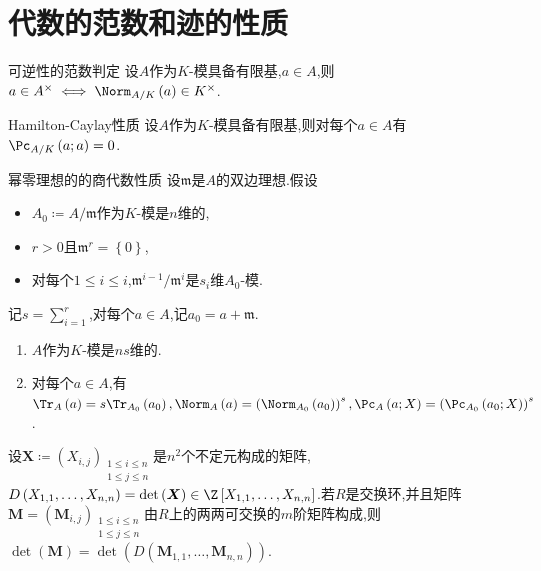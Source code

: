 \section{代数的范数和迹的性质}

\begin{proposition}{可逆性的范数判定}{}
	设$A$作为$K$-模具备有限基,$a\in A$,则$a\in A^{\times}\iff\Norm_{A/K}\left(a\right)\in K^{\times}$.
\end{proposition}

\begin{proposition}{Hamilton-Caylay性质}{}
	设$A$作为$K$-模具备有限基,则对每个$a\in A$有$\Pc_{A/K}\left(a;a\right)=0$.
\end{proposition}

\begin{proposition}{幂零理想的的商代数性质}{}
	设$\mathfrak{m}$是$A$的双边理想.假设
	\begin{itemize}
		\item $A_{0}\coloneq A/\mathfrak{m}$作为$K$-模是$n$维的,
		\item $r>0$且$\mathfrak{m}^{r}=\left\{0\right\}$,
		\item 对每个$1\leq i\leq i$,$\mathfrak{m}^{i-1}/\mathfrak{m}^{i}$是$s_{i}$维$A_{0}$-模.
	\end{itemize}
	记$s=\sum\limits_{i=1}^{r}$,对每个$a\in A$,记$a_{0}=a+\mathfrak{m}$.
	\begin{enumerate}
		\item $A$作为$K$-模是$ns$维的.
		\item 对每个$a\in A$,有$\Tr_{A}\left(a\right)=s\Tr_{A_{0}}\left(a_{0}\right),\Norm_{A}\left(a\right)=\left(\Norm_{A_{0}}\left(a_{0}\right)\right)^{s},\Pc_{A}\left(a;X\right)=\left(\Pc_{A_{0}}\left(a_{0};X\right)\right)^{s}$.
	\end{enumerate}
\end{proposition}

\begin{lemma}{}{}
	设$\boldsymbol{X}\coloneq\left(X_{i,j}\right)_{\substack{1\leq i\leq n\\1\leq j\leq n}}$是$n^{2}$个不定元构成的矩阵,$D\left(X_{1,1},\ldots,X_{n,n}\right)=\det\left(\boldsymbol{X}\right)\in\Z\left[X_{1,1},\ldots,X_{n,n}\right]$.若$R$是交换环,并且矩阵$\boldsymbol{M}=\left(\boldsymbol{M}_{i,j}\right)_{\substack{1\leq i\leq n\\1\leq j\leq n}}$由$R$上的两两可交换的$m$阶矩阵构成,则$\det\left(\boldsymbol{M}\right)=\det\left(D\left(\boldsymbol{M}_{1,1},\ldots,\boldsymbol{M}_{n,n}\right)\right)$.
\end{lemma}

